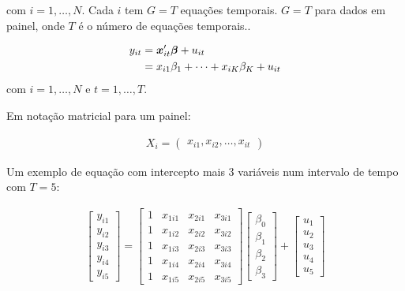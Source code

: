 \documentclass[11pt,oneside,a4paper]{article}
\numberwithin{equation}{section}
\begin{document}
\noindent
com $i = 1, \dots, N$.
Cada $i$ tem $G=T$ equações temporais.
$G=T$ para dados em painel, onde $T$ é o número de equações temporais..


\vspace{-1.5 em}
\begin{align*}
	y_{it} &= \boldsymbol{x}^{\prime}_{it} \boldsymbol{\beta} + u_{it}
	\\
	 &= x_{i1} \beta_{1} + \dots + x_{iK} \beta_{K} + u_{it}
\end{align*}
com	$i = 1, \dots, N$ e	$t = 1, \dots, T$.

\vspace{1 em}
Em notação matricial para um painel:

\vspace{-1.5 em}
\begin{align*}
	X_{i} =
	\begin{pmatrix}
		x_{i1}, x_{i2}, \dots, x_{it}
	\end{pmatrix}
\end{align*}

Um exemplo de equação com intercepto mais 3 variáveis num intervalo de tempo com $T=5$:

\vspace{-1.5 em}
\begin{align*}
\begin{bmatrix}
y_{i 1} \\ y_{i 2} \\ y_{i 3} \\ y_{i 4} \\ y_{i 5}
\end{bmatrix}
=
\begin{bmatrix}
	1 & x_{1i1} & x_{2i1} & x_{3i1}	\\
	1 & x_{1i2} & x_{2i2} & x_{3i2} \\
	1 & x_{1i3} & x_{2i3} & x_{3i3} \\
	1 & x_{1i4} & x_{2i4} & x_{3i4} \\
	1 & x_{1i5} & x_{2i5} & x_{3i5}
\end{bmatrix}
\begin{bmatrix}
	\beta_{0} \\ \beta_{1} \\ \beta_{2} \\ \beta_{3}
\end{bmatrix}
+
\begin{bmatrix}
	u_{1} \\ u_{2} \\ u_{3} \\ u_{4} \\ u_{5}
\end{bmatrix}
\end{align*}
\end{document}
